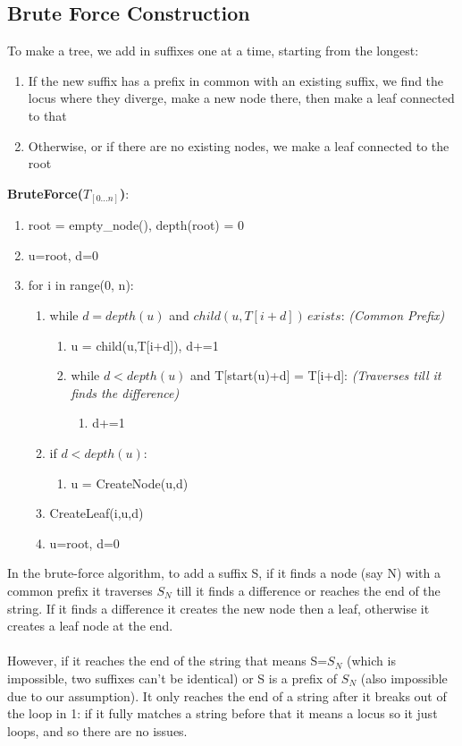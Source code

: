 \subsection{Brute Force Construction}
To make a tree, we add in suffixes one at a time, starting from the longest:
\begin{enumerate}
    \item If the new suffix has a prefix in common with an existing suffix, we find the locus where they diverge, make a new node there, then make a leaf connected to that
    \item Otherwise, or if there are no existing nodes, we make a leaf connected to the root \\
\end{enumerate}

\textbf{BruteForce($T_{[0\dots n]}$)}:
\begin{enumerate}[label=\Alph*]
    \item root = empty\_node(), depth(root) = 0
    \item u=root, d=0
    \item for i in range(0, n):
\begin{enumerate}[label=\arabic*]
    \item while $d = depth(u)$ and $child(u,T[i+d])\, exists$: \emph{(Common Prefix)}
    \begin{enumerate}
        \item u = child(u,T[i+d]), d+=1
        \item while $d < depth(u)$ and T[start(u)+d] = T[i+d]: \emph{(Traverses till it finds the difference)}
        \begin{enumerate}
            \item [] d+=1
        \end{enumerate} 
    \end{enumerate}
    \item if $d < depth(u)$:
    \begin{enumerate}
        \item [] u = CreateNode(u,d)
    \end{enumerate}    
    \item CreateLeaf(i,u,d)
    \item u=root, d=0
\end{enumerate}    
\end{enumerate}
In the brute-force algorithm, to add a suffix S, if it finds a node (say N) with a common prefix it traverses $S_N$ till it finds a difference or reaches the end of the string. If it finds a difference it creates the new node then a leaf, otherwise it creates a leaf node at the end. \\ \\
However, if it reaches the end of the string that means S=$S_N$ (which is impossible, two suffixes can't be identical) or S is a prefix of $S_N$ (also impossible due to our assumption). It only reaches the end of a string after it breaks out of the loop in 1: if it fully matches a string before that it means a locus so it just loops, and so there are no issues. \\ \\

